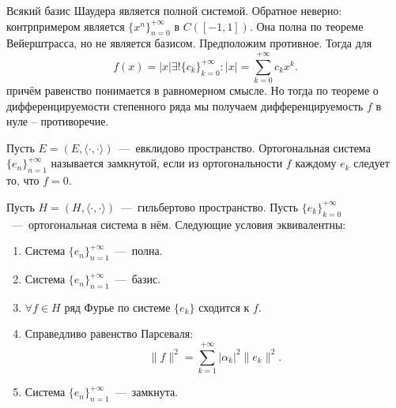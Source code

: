 \begin{note}
    Всякий базис Шаудера является полной системой.
    Обратное неверно: контрпримером является $\{x^n\}_{n = 0}^{+\infty}$ в $C([-1, 1])$.
    Она полна по теореме Вейерштрасса, но не является базисом.
    Предположим противное.
    Тогда для
    \[
        f(x) = |x| \exists ! \{c_k\}_{k = 0}^{+\infty}: |x| = \sum\limits_{k = 0}^{+\infty} c_k x^k.
    \]
    причём равенство понимается в равномерном смысле.
    Но тогда по теореме о дифференцируемости степенного ряда мы получаем дифференцируемость $f$ в нуле -- противоречие.
\end{note}
\begin{definition}
    Пусть $E = (E, \langle \cdot, \cdot \rangle)$~---~евклидово пространство.
    Ортогональная система $\{e_n\}_{n = 1}^{+\infty}$ называется замкнутой, если из ортогональности $f$ каждому $e_k$ следует то, что $f = 0$.
\end{definition}
\begin{theorem}
    Пусть $H = (H, \langle \cdot, \cdot \rangle)$~---~гильбертово пространство.
    Пусть $\{e_k\}_{k = 0}^{+\infty}$~---~ортогональная система в нём.
    Следующие условия эквивалентны:
    \begin{enumerate}
        \item Система $\{e_n\}_{n = 1}^{+\infty}$~---~полна.
        \item Система $\{e_n\}_{n = 1}^{+\infty}$~---~базис.
        \item $\forall f \in H$ ряд Фурье по системе $\{e_k\}$ сходится к $f$.
        \item Справедливо равенство Парсеваля:
        \[
            \|f\|^2 = \sum\limits_{k = 1}^{+\infty} |\alpha_k|^2 \|e_k\|^2.
        \]
        \item Система $\{e_n\}_{n = 1}^{+\infty}$~---~замкнута.
    \end{enumerate}
\end{theorem}
